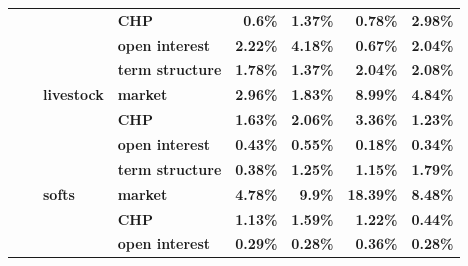 \documentclass[
  authoryear,
  preprint,
  3p]{elsarticle}
\begin{document}
\begin{longtable}[t]{>{}l>{}l>{}l>{}l>{}r>{}r>{}r>{}r}
\textbf{} & \textbf{} & \textbf{} & \textbf{CHP} & \textcolor[HTML]{4285f4}{\textbf{0.6\%}} & \textcolor[HTML]{4285f4}{\textbf{1.37\%}} & \textcolor[HTML]{4285f4}{\textbf{0.78\%}} & \textcolor[HTML]{4285f4}{\textbf{2.98\%}}\\
\addlinespace
\textbf{} & \textbf{} & \textbf{} & \textbf{open interest} & \textcolor[HTML]{4285f4}{\textbf{2.22\%}} & \textcolor[HTML]{4285f4}{\textbf{4.18\%}} & \textcolor[HTML]{4285f4}{\textbf{0.67\%}} & \textcolor[HTML]{4285f4}{\textbf{2.04\%}}\\
\textbf{} & \textbf{} & \textbf{} & \textbf{term structure} & \textcolor[HTML]{4285f4}{\textbf{1.78\%}} & \textcolor[HTML]{4285f4}{\textbf{1.37\%}} & \textcolor[HTML]{4285f4}{\textbf{2.04\%}} & \textcolor[HTML]{4285f4}{\textbf{2.08\%}}\\
\textbf{} & \textbf{} & \textbf{livestock} & \textbf{market} & \textcolor[HTML]{4285f4}{\textbf{2.96\%}} & \textcolor[HTML]{4285f4}{\textbf{1.83\%}} & \textcolor[HTML]{4285f4}{\textbf{8.99\%}} & \textcolor[HTML]{4285f4}{\textbf{4.84\%}}\\
\textbf{} & \textbf{} & \textbf{} & \textbf{CHP} & \textcolor[HTML]{4285f4}{\textbf{1.63\%}} & \textcolor[HTML]{4285f4}{\textbf{2.06\%}} & \textcolor[HTML]{4285f4}{\textbf{3.36\%}} & \textcolor[HTML]{4285f4}{\textbf{1.23\%}}\\
\textbf{} & \textbf{} & \textbf{} & \textbf{open interest} & \textcolor[HTML]{4285f4}{\textbf{0.43\%}} & \textcolor[HTML]{4285f4}{\textbf{0.55\%}} & \textcolor[HTML]{4285f4}{\textbf{0.18\%}} & \textcolor[HTML]{4285f4}{\textbf{0.34\%}}\\
\addlinespace
\textbf{} & \textbf{} & \textbf{} & \textbf{term structure} & \textcolor[HTML]{4285f4}{\textbf{0.38\%}} & \textcolor[HTML]{4285f4}{\textbf{1.25\%}} & \textcolor[HTML]{4285f4}{\textbf{1.15\%}} & \textcolor[HTML]{4285f4}{\textbf{1.79\%}}\\
\textbf{} & \textbf{} & \textbf{softs} & \textbf{market} & \textcolor[HTML]{4285f4}{\textbf{4.78\%}} & \textcolor[HTML]{4285f4}{\textbf{9.9\%}} & \textcolor[HTML]{4285f4}{\textbf{18.39\%}} & \textcolor[HTML]{4285f4}{\textbf{8.48\%}}\\
\textbf{} & \textbf{} & \textbf{} & \textbf{CHP} & \textcolor[HTML]{4285f4}{\textbf{1.13\%}} & \textcolor[HTML]{4285f4}{\textbf{1.59\%}} & \textcolor[HTML]{4285f4}{\textbf{1.22\%}} & \textcolor[HTML]{4285f4}{\textbf{0.44\%}}\\
\textbf{} & \textbf{} & \textbf{} & \textbf{open interest} & \textcolor[HTML]{4285f4}{\textbf{0.29\%}} & \textcolor[HTML]{4285f4}{\textbf{0.28\%}} & \textcolor[HTML]{4285f4}{\textbf{0.36\%}} & \textcolor[HTML]{4285f4}{\textbf{0.28\%}}\\

\end{longtable}
\end{document}
